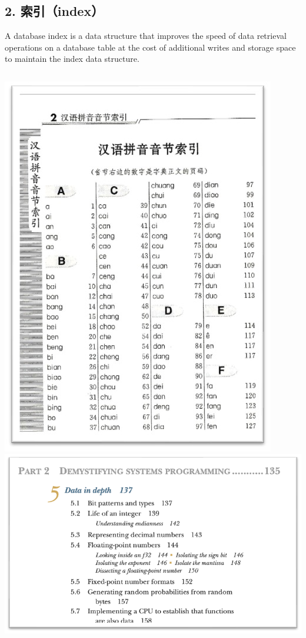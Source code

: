 \documentclass[aspectratio=169, 14pt]{beamer}
\begin{document}
\begin{frame}
    \section{\textcolor{darkmidnightblue}{2. 索引（index）}}
    A database index is a data structure that improves the speed of data retrieval operations on a database table at the cost of additional writes and storage space to maintain the index data structure.
\end{frame}

\begin{frame}
    \begin{columns}
        \includegraphics[width=.8\textwidth]{week11/dict}
        \includegraphics[width=.99\textwidth]{week11/book}
    \end{columns}
\end{frame}
\end{document}
